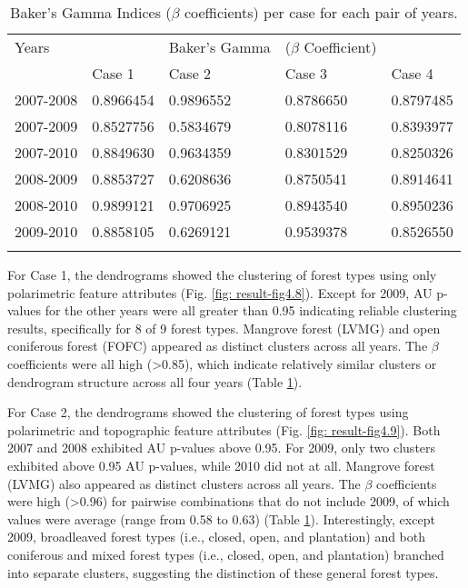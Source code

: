\begin{spacing}{1.0}
\begin{longtable}[h!]{ p{2.5cm} p{2.6cm} p{2.8cm} p{2.6cm} p{2.5cm} }

    \caption[Baker's Gamma Indices ($\beta$ coefficients) per case for each pair of years.]{Baker's Gamma Indices ($\beta$ coefficients) per case for each pair of years.}
    \label{tab: result-table4.1}\\
    
    	\toprule
    	Years & {} & Baker's Gamma & ($\beta$ Coefficient) & {}\\
    	\cmidrule{2-5}
    	{} & Case 1 & Case 2 & Case 3 & Case 4\\
    	\midrule
    	\endhead
    	
		2007-2008 & 0.8966454 & 0.9896552 & 0.8786650 & 0.8797485\\
		2007-2009 & 0.8527756 & 0.5834679 & 0.8078116 & 0.8393977\\
		2007-2010 & 0.8849630 & 0.9634359 & 0.8301529 & 0.8250326\\
		2008-2009 & 0.8853727 & 0.6208636 & 0.8750541 & 0.8914641\\
		2008-2010 & 0.9899121 & 0.9706925 & 0.8943540 & 0.8950236\\
		2009-2010 & 0.8858105 & 0.6269121 & 0.9539378 & 0.8526550\\
				
		\bottomrule \\
    
\end{longtable}
\end{spacing}

For Case 1, the dendrograms showed the clustering of forest types using only polarimetric feature attributes (Fig. \ref{fig: result-fig4.8}). Except for 2009, AU p-values for the other years were all greater than 0.95 indicating reliable clustering results, specifically for 8 of 9 forest types. Mangrove forest (LVMG) and open coniferous forest (FOFC) appeared as distinct clusters across all years. The $\beta$ coefficients were all high (\textgreater0.85), which indicate relatively similar clusters or dendrogram structure across all four years (Table \ref{tab: result-table4.1}).

For Case 2, the dendrograms showed the clustering of forest types using polarimetric and topographic feature attributes (Fig. \ref{fig: result-fig4.9}). Both 2007 and 2008 exhibited AU p-values above 0.95. For 2009, only two clusters exhibited above 0.95 AU p-values, while 2010 did not at all. Mangrove forest (LVMG) also appeared as distinct clusters across all years. The $\beta$ coefficients were high (\textgreater0.96) for pairwise combinations that do not include 2009, of which values were average (range from 0.58 to 0.63) (Table \ref{tab: result-table4.1}). Interestingly, except 2009, broadleaved forest types (i.e., closed, open, and plantation) and both coniferous and mixed forest types (i.e., closed, open, and plantation) branched into separate clusters, suggesting the distinction of these general forest types.

